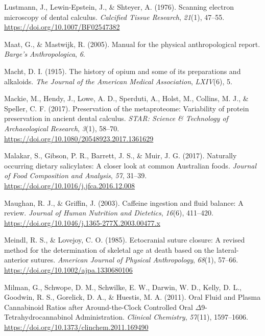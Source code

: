 \documentclass[
  b5paper,
]{book}
\newlength{\cslhangindent}
\newlength{\cslentryspacingunit} %
\newenvironment{CSLReferences}[2] %
 {%
  \setlength{\parindent}{0pt}
  \ifodd #1
  \let\oldpar\par
  \def\par{\hangindent=\cslhangindent\oldpar}
  \fi
  \setlength{\parskip}{#2\cslentryspacingunit}
 }%
 {}
\begin{document}
\begin{CSLReferences}{1}{0}
\leavevmode{}%
Lustmann, J., Lewin-Epstein, J., \& Shteyer, A. (1976). Scanning
electron microscopy of dental calculus. \emph{Calcified Tissue
Research}, \emph{21}(1), 47--55.
\url{https://doi.org/10.1007/BF02547382}

\leavevmode{}%
Maat, G., \& Mastwijk, R. (2005). Manual for the physical
anthropological report. \emph{Barge's Anthropologica}, \emph{6}.

\leavevmode{}%
Macht, D. I. (1915). The history of opium and some of its preparations
and alkaloids. \emph{The Journal of the American Medical Association},
\emph{LXIV}(6), 5.

\leavevmode{}%
Mackie, M., Hendy, J., Lowe, A. D., Sperduti, A., Holst, M., Collins, M.
J., \& Speller, C. F. (2017). Preservation of the metaproteome:
Variability of protein preservation in ancient dental calculus.
\emph{STAR: Science \& Technology of Archaeological Research},
\emph{3}(1), 58--70. \url{https://doi.org/10.1080/20548923.2017.1361629}

\leavevmode{}%
Malakar, S., Gibson, P. R., Barrett, J. S., \& Muir, J. G. (2017).
Naturally occurring dietary salicylates: {A} closer look at common
{Australian} foods. \emph{Journal of Food Composition and Analysis},
\emph{57}, 31--39. \url{https://doi.org/10.1016/j.jfca.2016.12.008}

\leavevmode{}%
Maughan, R. J., \& Griffin, J. (2003). Caffeine ingestion and fluid
balance: A review. \emph{Journal of Human Nutrition and Dietetics},
\emph{16}(6), 411--420.
\url{https://doi.org/10.1046/j.1365-277X.2003.00477.x}

\leavevmode{}%
Meindl, R. S., \& Lovejoy, C. O. (1985). Ectocranial suture closure: {A}
revised method for the determination of skeletal age at death based on
the lateral-anterior sutures. \emph{American Journal of Physical
Anthropology}, \emph{68}(1), 57--66.
\url{https://doi.org/10.1002/ajpa.1330680106}

\leavevmode{}%
Milman, G., Schwope, D. M., Schwilke, E. W., Darwin, W. D., Kelly, D.
L., Goodwin, R. S., Gorelick, D. A., \& Huestis, M. A. (2011). Oral
{Fluid} and {Plasma Cannabinoid Ratios} after {Around-the-Clock
Controlled Oral \(\Delta\)9-Tetrahydrocannabinol Administration}.
\emph{Clinical Chemistry}, \emph{57}(11), 1597--1606.
\url{https://doi.org/10.1373/clinchem.2011.169490}


\end{CSLReferences}
\end{document}
